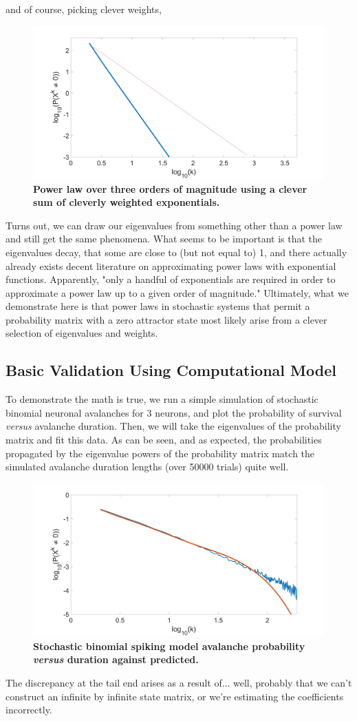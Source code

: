 \documentclass[superscriptaddress]{revtex4-1}
\begin{document}
and of course, picking clever weights,
\begin{figure}[h!]
	\centering
	\includegraphics[width=0.5\columnwidth]{power_exp_diff_2.jpg}
	\caption{\textbf{Power law over three orders of magnitude using a clever sum of cleverly weighted exponentials.}}
\end{figure}

Turns out, we can draw our eigenvalues from something other than a power law and still get the same phenomena. What seems to be important is that the eigenvalues decay, that some are close to (but not equal to) 1, and there actually already exists decent literature on approximating power laws with exponential functions. Apparently, "only a handful of exponentials are required in order to approximate a power law up to a given order of magnitude." Ultimately, what we demonstrate here is that power laws in stochastic systems that permit a probability matrix with a zero attractor state most likely arise from a clever selection of eigenvalues and weights.
\FloatBarrier






\subsection{Basic Validation Using Computational Model}
To demonstrate the math is true, we run a simple simulation of stochastic binomial neuronal avalanches for 3 neurons, and plot the probability of survival \emph{versus} avalanche duration. Then, we will take the eigenvalues of the probability matrix and fit this data. As can be seen, and as expected, the probabilities propagated by the eigenvalue powers of the probability matrix match the simulated avalanche duration lengths (over 50000 trials) quite well. 
\begin{figure}[h!]
	\centering
	\includegraphics[width=0.5\columnwidth]{power_prob_sim_2.jpg}
	\caption{\textbf{Stochastic binomial spiking model avalanche probability \emph{versus} duration against predicted.}}
\end{figure}
The discrepancy at the tail end arises as a result of... well, probably that we can't construct an infinite by infinite state matrix, or we're estimating the coefficients incorrectly. 
\end{document}
